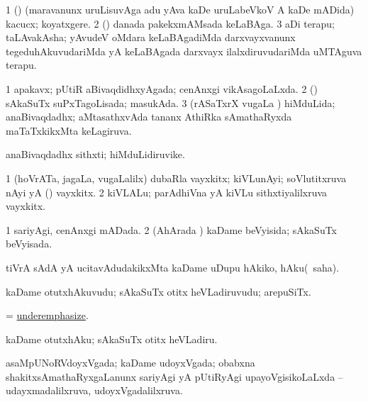 \bentry
{} 
\gl{\nA}
\expl{}
\bmng
\bnum
\num{1} (\ame) (maravanunx uruLisuvAga adu yAva kaDe uruLabeVkoV A kaDe mADida) kacucx; koyatxgere. 
\num{2} (\birx) danada pakekxmAMsada keLaBAga. 
\num{3} aDi terapu; taLAvakAsha; yAvudeV oMdara keLaBAgadiMda darxvayxvanunx tegeduhAkuvudariMda yA keLaBAgada darxvayx ilalxdiruvudariMda uMTAguva terapu. 
\enum
\emng
\eentry

\bentry
{} 
\gl{\gu}
\expl{}
\bmng
\bnum
\num{1} apakavx; pUtiR aBivaqdidhxyAgada; cenAnxgi vikAsagoLaLxda. 
\num{2} (\CA) sAkaSuTx suPxTagoLisada; masukAda. 
\num{3} (rASaTxrX \mo vugaLa \vi) hiMduLida; anaBivaqdadhx; aMtasathxvAda tananx AthiRka sAmathaRyxda maTaTxkikxMta keLagiruva. 
\enum
\emng
\eentry

\bentry
{} 
\gl{\nA}
\expl{}
\bmng
 anaBivaqdadhx sithxti; hiMduLidiruvike. 
\emng
\eentry

\bentry
{} 
\gl{\nA}
\expl{}
\bmng
\bnum
\num{1} (hoVrATa, jagaLa, \mo vugaLalilx) dubaRla vayxkitx; kiVLunAyi; soVlutitxruva nAyi yA (\sA) vayxkitx. 
\num{2} kiVLALu; parAdhiVna yA kiVLu sithxtiyalilxruva vayxkitx. 
\enum
\emng
\eentry

\bentry
{} 
\gl{\gu}
\expl{}
\bmng
\bnum
\num{1} sariyAgi, cenAnxgi mADada. 
\num{2} (AhArada \vi) kaDame beVyisida; sAkaSuTx beVyisada. 
\enum
\emng
\eentry

\bentry
{} 
\gl{\sakirx}
\expl{}
\bmng
 tiVrA sAdA yA ucitavAdudakikxMta kaDame uDupu hAkiko, hAku(\akirx\ saha). 
\emng
\eentry

\bentry
{} 
\gl{\nA}
\bmng
 kaDame otutxhAkuvudu; sAkaSuTx otitx heVLadiruvudu; arepuSiTx. 
\emng
\eentry

\bentry
{} 
\gl{\sakirx}
\expl{}
\bmng
= \hyperlink{underemphasize}{underemphasize}. 
\emng
\eentry

\bentry
{} 
\gl{\akirx}
\expl{}
\bmng
 kaDame otutxhAku; sAkaSuTx otitx heVLadiru. 
\emng
\eentry

\bentry
{} 
\gl{\gu}
\expl{}
\bmng
 asaMpUNoRVdoyxVgada; kaDame udoyxVgada; obabxna shakitxsAmathaRyxgaLanunx sariyAgi yA pUtiRyAgi upayoVgisikoLaLxda -- udayxmadalilxruva, udoyxVgadalilxruva. 
\emng
\eentry

